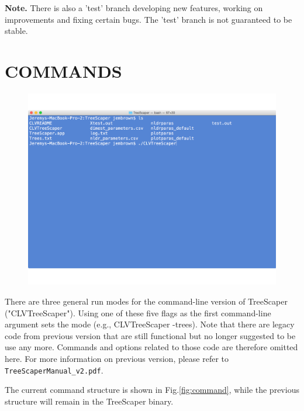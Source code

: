 \documentclass[11pt]{article}
\begin{document}
	{\bf Note.} There is also a 'test' branch developing new features, working on improvements and fixing certain bugs. The 'test' branch is not guaranteed to be stable. 





\newpage


\section{COMMANDS}\label{sect:COMMANDS}

\begin{figure}[thbp!]\centering
\includegraphics[scale=0.4]{imagesForManual/CLVTreeScaper.pdf}
\end{figure}

There are three general run modes for the command-line version of TreeScaper
("CLVTreeScaper"). Using one of these five flags as the first command-line argument sets
the mode (e.g., CLVTreeScaper -trees). Note that there are legacy code from previous version that are still functional but no longer suggested to be use any more. Commands and options related to those code are therefore omitted here. For more information on previous version, please refer to \\
{\tt TreeScaperManual\_v2.pdf}.

The current command structure is shown in Fig.\ref{fig:command}, while the previous structure will remain in the TreeScaper binary. 
	
\end{document}
